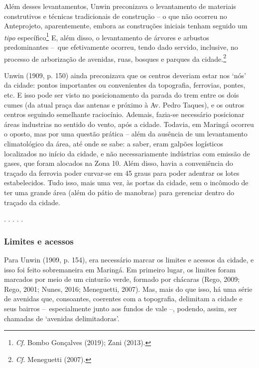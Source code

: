 \documentclass[12pt, a4paper]{book} %
\begin{document}
        Além desses levantamentos, Unwin preconizava o levantamento de materiais construtivos e técnicas tradicionais de construção – o que não ocorreu no Anteprojeto, aparentemente, embora as construções iniciais tenham seguido um \textit{tipo} específico\footnote[99]{\textit{Cf.} Bombo Gonçalves (2019); Zani (2013).} E, além disso, o levantamento de árvores e arbustos predominantes – que efetivamente ocorreu, tendo dado servido, inclusive, no processo de arborização de avenidas, ruas, bosques e parques da cidade.\footnote[100]{\textit{Cf.} Meneguetti (2007).}

        Unwin (1909, p. 150) ainda preconizava que os centros deveriam estar nos `nós' da cidade: pontos importantes ou convenientes da topografia, ferrovias, pontes, etc. E isso pode ser visto no posicionamento da parada do trem entre os dois cumes (da atual praça das antenas e próximo à Av. Pedro Taques), e os outros centros seguindo semelhante raciocínio. Ademais, fazia-se necessário posicionar áreas industrias no sentido do vento, após a cidade. Todavia, em Maringá ocorreu o oposto, mas por uma questão prática – além da ausência de um levantamento climatológico da área, até onde se sabe: a saber, eram galpões logísticos localizados no início da cidade, e não necessariamente indústrias com emissão de gases, que foram alocados na Zona 10. Além disso, havia a conveniência do traçado da ferrovia poder curvar-se em 45 graus para poder adentrar os lotes estabelecidos. Tudo isso, mais uma vez, às portas da cidade, sem o incômodo de ter uma grande área (além do pátio de manobras) para gerenciar dentro do traçado da cidade.

        \begin{center}
            . . . . .
        \end{center} 

                \subsubsection*{Limites e acessos}

        Para Unwin (1909, p. 154), era necessário marcar os limites e acessos da cidade, e isso foi feito sobremaneira em Maringá. Em primeiro lugar, os limites foram marcados por meio de um cinturão verde, formado por chácaras (Rego, 2009; Rego, 2001; Nunes, 2016; Meneguetti, 2007). Mas, mais do que isso, há uma série de avenidas que, consoantes, coerentes com a topografia, delimitam a cidade e seus bairros – especialmente junto aos fundos de vale –, podendo, assim, ser chamadas de `avenidas delimitadoras'.
\end{document}
